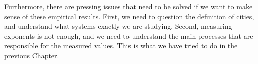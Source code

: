 Furthermore, there are pressing issues that need to be solved if we want to make
sense of these empirical results. First, we need to question the definition of
cities, and understand what systems exactly we are studying. Second, measuring
exponents is not enough, and we need to understand the main processes that are
responsible for the measured values. This is what we have tried to do in the
previous Chapter.
